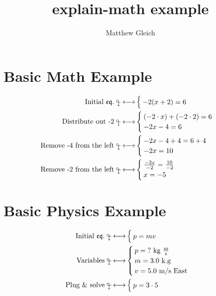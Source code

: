 \documentclass{report}
\title{explain-math example}
\author{Matthew Gleich}
\date{}
\begin{document}
    \maketitle

    \section{Basic Math Example}
        \begin{align*}
            \initialeq{-2(x + 2) = 6}
            \explain{Distribute out -2}{
                (-2 \cdot x) + (-2 \cdot 2) = 6 \\
                -2x - 4 = 6
            }
            \explain{Remove -4 from the left}{
                -2x - 4 + 4 = 6 + 4 \\
                -2x = 10
            }
            \explain{Remove -2 from the left}{
                \frac{-2x}{-2} = \frac{10}{-2} \\
                x = -5
            }
        \end{align*}

    \section{Basic Physics Example}
        \begin{align*}
            \initialeq{p = mv}
            \variables{
                \varu{p}{\text{?}}{kg $ \frac{\text{m}}{\text{s}} $} \\
                \varu{m}{3.0}{k.g} \\
                \varu{v}{5.0}{m/s East}
            }
            \explain{Plug \& solve}{p = 3 \cdot 5}
        \end{align*}
\end{document}
